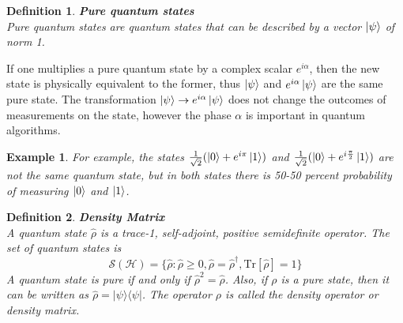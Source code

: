 \documentclass[12pt, a4paper,  nobibnotes]{article}
\newcommand{\ketbra}[2]{|#1\rangle\langle#2|}
\newcommand{\Tr}[1]{\mathrm{Tr}\left[#1\right]}
\newtheorem*{example*}{Example}
\newtheorem{definition}{Definition}
\begin{document}
\begin{definition}
    \textbf{Pure quantum states}\\
    Pure quantum states are quantum states that can be described by a vector $\ket\psi$ of norm 1. 
\end{definition}
If one multiplies a pure quantum state by a complex scalar $e^{i\alpha}$, then the new state is 
physically equivalent to the former, thus $\ket\psi$ and $e^{i\alpha}\ket\psi$ are 
the same pure state.
The transformation $\ket\psi\rightarrow e^{i\alpha}\ket\psi$ does not change the outcomes of measurements on the state,
however the phase $\alpha$ is important in quantum algorithms.
\begin{example*}
    For example, the states $\frac{1}{\sqrt 2}(\ket 0 + e^{i\pi}\ket 1)$ and $\frac{1}{\sqrt 2}(\ket 0 + e^{i\frac{\pi}{2}}\ket 1)$
    are not the same quantum state, but in both states there is 50-50 percent probability of measuring $\ket 0$ and $\ket 1$.
\end{example*}

\begin{definition}
    \textbf{Density Matrix}\\
    A quantum state $\hat\rho$ is a trace-1, self-adjoint, positive semidefinite operator.
    The set of quantum states is
    \begin{equation*}
        \mathcal{S(H)} = \{ \hat\rho : \hat\rho \geq 0, \hat\rho=\hat\rho^{\dagger}, \Tr{\hat\rho} = 1 \}
    \end{equation*}
    A quantum state is pure if and only if $\hat\rho^2=\hat\rho$. 
    Also, if $\rho$ is a pure state, then it can be written as $\hat\rho = \ketbra{\psi}{\psi}$.
    The operator $\rho$ is called the \textit{density operator} or \textit{density matrix}.
    \label{def:densityop}
\end{definition}
\end{document}
